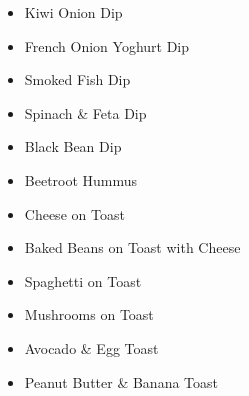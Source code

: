 \begin{itemize}
  \item \todo Kiwi Onion Dip 
  \item \todo French Onion Yoghurt Dip
  \item \todo Smoked Fish Dip 
  \item \todo Spinach \& Feta Dip
  \item \todo Black Bean Dip
  \item \todo Beetroot Hummus
\end{itemize}

\begin{itemize}
  \item \todo Cheese on Toast 
  \item \todo Baked Beans on Toast with Cheese
  \item \todo Spaghetti on Toast
  \item \todo Mushrooms on Toast
  \item \todo Avocado \& Egg Toast
  \item \todo Peanut Butter \& Banana Toast
\end{itemize}
